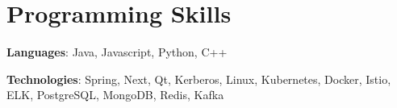 

\section{Programming Skills}\label{sec:programming-skills}
\resumeSubHeadingListStart
\item{
    \textbf{Languages}{: Java, Javascript, Python, C++}
}
\item{
    \textbf{Technologies}{: Spring, Next, Qt, Kerberos, Linux, Kubernetes, Docker, Istio, ELK, PostgreSQL, MongoDB, Redis, Kafka}
}
\resumeSubHeadingListEnd
